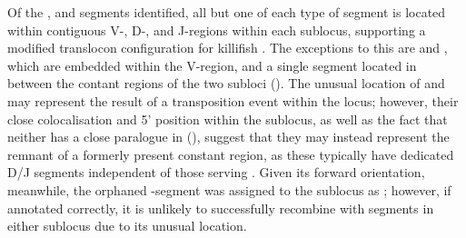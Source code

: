 Of the \vh, \dh and \jh segments identified, all but one of each type of segment is located within contiguous V-, D-, and J-regions within each sublocus, supporting a modified translocon configuration for killifish \igh. The exceptions to this are  and , which are embedded within the  V-region, and a single \vh segment located in between the  contant regions of the two subloci (). The unusual location of  and  may represent the result of a transposition event within the \igh{} locus; however, their close colocalisation and 5' position within the  sublocus, as well as the fact that neither has a close paralogue in  (), suggest that they may instead represent the remnant of a formerly present  constant region, as these typically have dedicated D/J segments independent of those serving . Given its forward orientation, meanwhile, the orphaned \vh-segment was assigned to the  sublocus as ; however, if annotated correctly, it is unlikely to successfully recombine with segments in either sublocus due to its unusual location.
		
